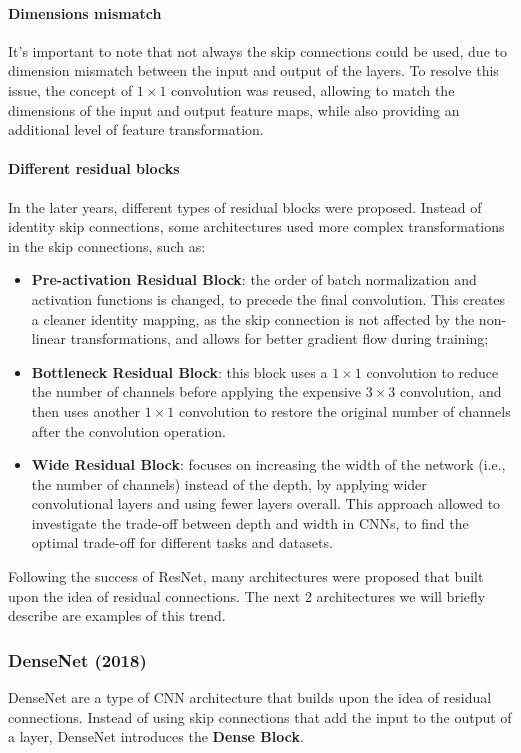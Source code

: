 \paragraph{Dimensions mismatch}
It's important to note that not always the skip connections could be used, due to dimension mismatch between the input and output of the layers.
To resolve this issue, the concept of $1 \times 1$ convolution was reused, allowing to match the dimensions of the input and output feature maps, 
while also providing an additional level of feature transformation.

\paragraph{Different residual blocks} 
In the later years, different types of residual blocks were proposed. Instead of identity skip connections, some architectures used more 
complex transformations in the skip connections, such as:
\begin{itemize}
    \item \textbf{Pre-activation Residual Block}: the order of batch normalization and activation functions is changed, to precede the
    final convolution. This creates a cleaner identity mapping, as the skip connection is not affected by the non-linear transformations, 
    and allows for better gradient flow during training;
    \item \textbf{Bottleneck Residual Block}: this block uses a $1 \times 1$ convolution to reduce the number of channels before applying the expensive $3 \times 3$ convolution,
    and then uses another $1 \times 1$ convolution to restore the original number of channels after the convolution operation.
    \item \textbf{Wide Residual Block}: focuses on increasing the width of the network (i.e., the number of channels) instead of the depth, by applying wider convolutional 
    layers and using fewer layers overall. This approach allowed to investigate the trade-off between depth and width in CNNs, to find the optimal trade-off for different tasks and datasets.
\end{itemize}
Following the success of ResNet, many architectures were proposed that built upon the idea of residual connections. 
The next 2 architectures we will briefly describe are examples of this trend.

\subsubsection{DenseNet (2018)}
DenseNet are a type of CNN architecture that builds upon the idea of residual connections. Instead of using skip connections that add the input to the output of a layer, 
DenseNet introduces the \textbf{Dense Block}. 

